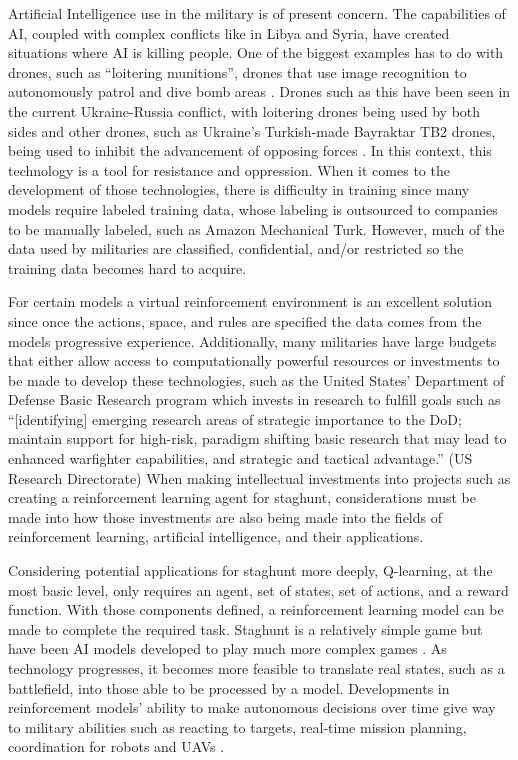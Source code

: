 \documentclass[10pt,twocolumn]{article}
\begin{document}
Artificial Intelligence use in the military is of present concern. The capabilities of AI, coupled with complex conflicts like in Libya and Syria, have created situations where AI is killing people. One of the biggest examples has to do with drones, such as “loitering munitions”, drones that use image recognition to autonomously patrol and dive bomb areas \cite{Vynck2021}. Drones such as this have been seen in the current Ukraine-Russia conflict, with loitering drones being used by both sides and other drones, such as Ukraine’s Turkish-made Bayraktar TB2 drones, being used to inhibit the advancement of opposing forces \cite{Vynck2022}. In this context, this technology is a tool for resistance and oppression. When it comes to the development of those technologies, there is difficulty in training since many models require labeled training data, whose labeling is outsourced to companies to be manually labeled, such as Amazon Mechanical Turk. However, much of the data used by militaries are classified, confidential, and/or restricted so the training data becomes hard to acquire.

For certain models a virtual reinforcement environment is an excellent solution since once the actions, space, and rules are specified the data comes from the models progressive experience. Additionally, many militaries have large budgets that either allow access to computationally powerful resources or investments to be made to develop these technologies, such as the United States’ Department of Defense Basic Research program which invests in research to fulfill goals such as “[identifying] emerging research areas of strategic importance to the DoD; maintain support for high-risk, paradigm shifting basic research that may lead to enhanced warfighter capabilities, and strategic and tactical advantage.” (US Research Directorate) When making intellectual investments into projects such as creating a reinforcement learning agent for staghunt, considerations must be made into how those investments are also being made into the fields of reinforcement learning, artificial intelligence, and their applications.

Considering potential applications for staghunt more deeply, Q-learning, at the most basic level, only requires an agent, set of states, set of actions, and a reward function. With those components defined, a reinforcement learning model can be made to complete the required task. Staghunt is a relatively simple game but have been AI models developed to play much more complex games \cite{Shead2018}. As technology progresses, it becomes more feasible to translate real states, such as a battlefield, into those able to be processed by a model. Developments in reinforcement models’ ability to make autonomous decisions over time give way to military abilities such as reacting to targets, real-time mission planning, coordination for robots and UAVs \cite{Strens2001}.
\end{document}
